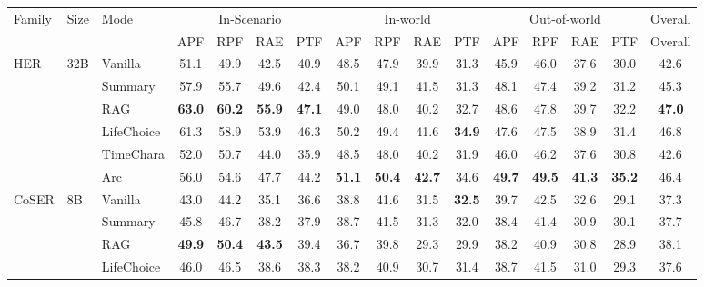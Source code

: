 \documentclass[11pt]{article}
\begin{document}
\begin{table}[!htbp]
\centering
\scriptsize
\setlength{\tabcolsep}{5pt}
\renewcommand{\arraystretch}{0.85}
\setlength{\aboverulesep}{0.2ex}
\setlength{\belowrulesep}{0.2ex}
\begin{tabular}{lllccccccccccccc}
\toprule
Family & Size & Mode & \multicolumn{4}{c}{In-Scenario} & \multicolumn{4}{c}{In-world} & \multicolumn{4}{c}{Out-of-world} & Overall \\
\cmidrule(lr){4-7} \cmidrule(lr){8-11} \cmidrule(lr){12-15} \cmidrule(lr){16-16}
 & & & APF & RPF & RAE & PTF & APF & RPF & RAE & PTF & APF & RPF & RAE & PTF & Overall \\
\midrule
\multirow[t]{6}{*}{HER} & \multirow[t]{6}{*}{32B} & Vanilla & 51.1 & 49.9 & 42.5 & 40.9 & 48.5 & 47.9 & 39.9 & 31.3 & 45.9 & 46.0 & 37.6 & 30.0 & 42.6 \\
 &  & Summary & 57.9 & 55.7 & 49.6 & 42.4 & 50.1 & 49.1 & 41.5 & 31.3 & 48.1 & 47.4 & 39.2 & 31.2 & 45.3 \\
 &  & RAG & \textbf{63.0} & \textbf{60.2} & \textbf{55.9} & \textbf{47.1} & 49.0 & 48.0 & 40.2 & 32.7 & 48.6 & 47.8 & 39.7 & 32.2 & \textbf{47.0} \\
 &  & LifeChoice & 61.3 & 58.9 & 53.9 & 46.3 & 50.2 & 49.4 & 41.6 & \textbf{34.9} & 47.6 & 47.5 & 38.9 & 31.4 & 46.8 \\
 &  & TimeChara & 52.0 & 50.7 & 44.0 & 35.9 & 48.5 & 48.0 & 40.2 & 31.9 & 46.0 & 46.2 & 37.6 & 30.8 & 42.6 \\
 &  & \cellcolor{yellow!15} Arc & \cellcolor{yellow!15} 56.0 & \cellcolor{yellow!15} 54.6 & \cellcolor{yellow!15} 47.7 & \cellcolor{yellow!15} 44.2 & \cellcolor{yellow!15} \textbf{51.1} & \cellcolor{yellow!15} \textbf{50.4} & \cellcolor{yellow!15} \textbf{42.7} & \cellcolor{yellow!15} 34.6 & \cellcolor{yellow!15} \textbf{49.7} & \cellcolor{yellow!15} \textbf{49.5} & \cellcolor{yellow!15} \textbf{41.3} & \cellcolor{yellow!15} \textbf{35.2} & \cellcolor{yellow!15} 46.4 \\
\midrule
\multirow[t]{12}{*}{CoSER} & \multirow[t]{6}{*}{8B} & Vanilla & 43.0 & 44.2 & 35.1 & 36.6 & 38.8 & 41.6 & 31.5 & \textbf{32.5} & 39.7 & 42.5 & 32.6 & 29.1 & 37.3 \\
 &  & Summary & 45.8 & 46.7 & 38.2 & 37.9 & 38.7 & 41.5 & 31.3 & 32.0 & 38.4 & 41.4 & 30.9 & 30.1 & 37.7 \\
 &  & RAG & \textbf{49.9} & \textbf{50.4} & \textbf{43.5} & 39.4 & 36.7 & 39.8 & 29.3 & 29.9 & 38.2 & 40.9 & 30.8 & 28.9 & 38.1 \\
 &  & LifeChoice & 46.0 & 46.5 & 38.6 & 38.3 & 38.2 & 40.9 & 30.7 & 31.4 & 38.7 & 41.5 & 31.0 & 29.3 & 37.6 \\

\end{tabular}
\end{table}
\end{document}
